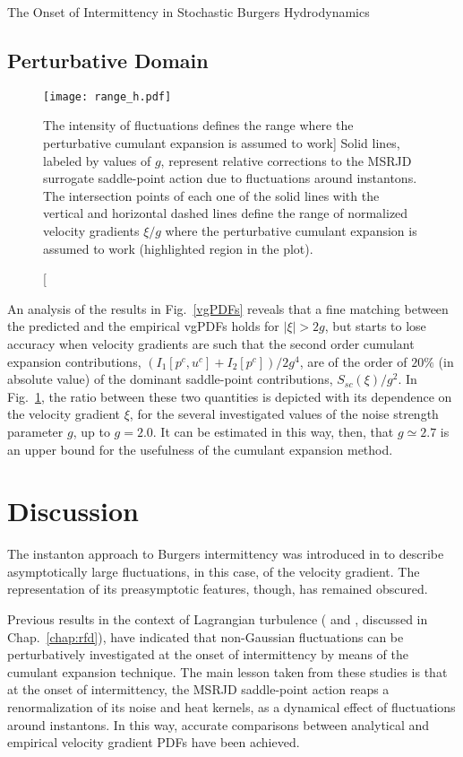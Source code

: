 \begin{chapter}{The Onset of Intermittency in Stochastic Burgers Hydrodynamics}
\subsection{Perturbative Domain}

\begin{figure}[h]
    \centering
    \texttt{[image: range\_h.pdf]}
    \caption
    [The intensity of fluctuations defines the range where the perturbative cumulant expansion is assumed to work]
    {Solid lines, labeled by values of $g$, represent relative corrections to the MSRJD surrogate saddle-point action due to fluctuations around instantons. The intersection points of each one of the solid lines with the vertical and horizontal dashed lines define the range of normalized velocity gradients $\xi/g$ where the perturbative cumulant expansion is assumed to work (highlighted region in the plot).} \label{pert_domain}
\end{figure}

An analysis of the results in Fig.~\ref{vgPDFs} reveals that a fine matching between the predicted and the empirical vgPDFs holds for $|\xi| > 2g$, but starts to lose accuracy when velocity gradients are such that the second order cumulant expansion contributions, $(I_1[p^c,u^c]+I_2[p^c])/2g^4$, are of the order of $20 \%$ (in absolute value) of the dominant saddle-point contributions, $S_{sc}(\xi)/g^2$. In Fig.~\ref{pert_domain}, the ratio between these two quantities is depicted with its dependence on the velocity gradient $\xi$, for the several investigated values of the noise strength parameter $g$, up to $g=2.0$. It can be estimated in this way, then, that $g \simeq 2.7$ is an upper bound for the usefulness of the cumulant expansion method.

\section{Discussion}

The instanton approach to Burgers intermittency was introduced in \textcite{gurarie1996,balkovsky1997} to describe asymptotically large fluctuations, in this case, of the velocity gradient. The representation of its preasymptotic features, though, has remained obscured.

Previous results in the context of Lagrangian turbulence (\textcite{moriconi2014} and \textcite{apolinario2019instantons}, discussed in Chap.~\ref{chap:rfd}), have indicated that non-Gaussian fluctuations can be perturbatively investigated at the onset of intermittency by means of the cumulant expansion technique. The main lesson taken from these studies is that at the onset of intermittency, the MSRJD saddle-point action reaps a renormalization of its noise and heat kernels, as a dynamical effect of fluctuations around instantons.
In this way, accurate comparisons between analytical and empirical velocity gradient PDFs have been achieved.


\end{chapter}

